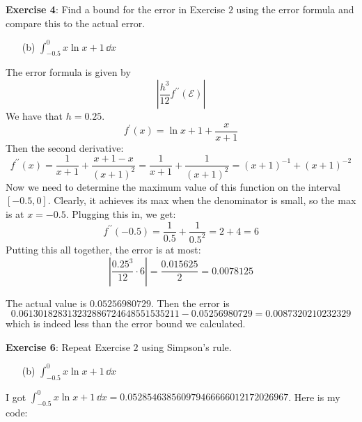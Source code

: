 \documentclass{article}
\begin{document}
\textbf{Exercise 4}: Find a bound for the error in Exercise $2$ using the error formula and compare this to the actual error.
    \begin{itemize}
        \item [(b)] $\int_{-0.5}^{0} x \ln{x + 1} \, \dd{x}$
    \end{itemize}
    \begin{answer}
        The error formula is given by
            \begin{equation*}
                \left\lvert \dfrac{h^{3}}{12}f^{\prime\prime}(\mathcal{E}) \right\rvert
            \end{equation*}
        We have that $h = 0.25$.
            \begin{equation*}
                f^{\prime}(x) = \ln{x + 1} + \dfrac{x}{x + 1}
            \end{equation*}
        Then the second derivative:
            \begin{equation*}
                f^{\prime\prime}(x) = \dfrac{1}{x + 1} + \dfrac{x + 1 - x}{(x + 1)^{2}} = \dfrac{1}{x + 1} + \dfrac{1}{(x + 1)^{2}} = (x + 1)^{-1} + (x + 1)^{-2}
            \end{equation*}
        Now we need to determine the maximum value of this function on the interval $[-0.5, 0]$. Clearly, it achieves its max when the denominator is small, so the max is at $x = -0.5$. Plugging this in, we get:
            \begin{equation*}
                f^{\prime\prime}(-0.5) = \dfrac{1}{0.5} + \dfrac{1}{0.5^{2}} = 2 + 4 = 6
            \end{equation*}
        Putting this all together, the error is at most:
            \begin{equation*}
                \left\lvert \dfrac{0.25^{3}}{12} \cdot 6 \right\rvert = \dfrac{0.015625}{2} = 0.0078125
            \end{equation*}

        The actual value is $0.05256980729$. Then the error is
            \begin{equation*}
                0.061301828313232886724648551535211 - 0.05256980729 = 0.0087320210232329
            \end{equation*}
        which is indeed less than the error bound we calculated.
    \end{answer}

\textbf{Exercise 6}: Repeat Exercise $2$ using Simpson's rule.
    \begin{itemize}
        \item [(b)] $\int_{-0.5}^{0} x \ln{x + 1} \, \dd{x}$
    \end{itemize}
    \begin{answer}
        I got $\int_{-0.5}^{0} x \ln{x + 1} \, \dd{x} = 0.052854638560979466666012172026967$. Here is my code:
        \inputminted{matlab}{./code/Integration/Simpson.m}
        \inputminted{matlab}{./code/script2.m}
    \end{answer}
\end{document}
